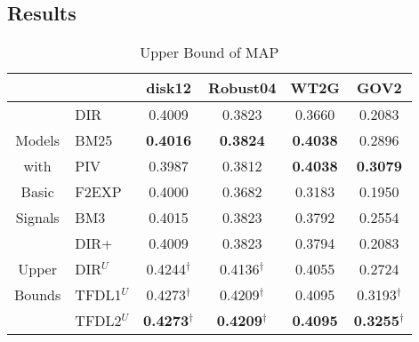 \subsection{Results}
\label{sec:res1}

\begin{table}[t]
\centering
\caption{Upper Bound of MAP}
\label{tab:results_optm}
\begin{tabular}{ clcccc } \hline
& & disk12 & Robust04 & WT2G & GOV2 \\ \hline \hline
& DIR & 0.4009 & 0.3823 & 0.3660 & 0.2083 \\ \cline{2-6}
Models & BM25 & \textbf{0.4016} & \textbf{0.3824} & \textbf{0.4038} & 0.2896 \\ \cline{2-6}
with & PIV & 0.3987 & 0.3812 & \textbf{0.4038} & \textbf{0.3079} \\ \cline{2-6}
Basic & F2EXP & 0.4000 & 0.3682 & 0.3183 & 0.1950 \\ \cline{2-6}
Signals & BM3 & 0.4015 & 0.3823 & 0.3792 & 0.2554 \\ \cline{2-6}
& DIR+ & 0.4009 & 0.3823 & 0.3794 & 0.2083 \\ \cline{2-6} \hline \hline 
Upper & DIR$^U$ & 0.4244$^\dagger$ & 0.4136$^\dagger$ & 0.4055 & 0.2724 \\ \cline{2-6}
Bounds & TFDL1$^U$ & 0.4273$^\dagger$ & 0.4209$^\dagger$ & 0.4095 & 0.3193$^\dagger$ \\ \cline{2-6}
& TFDL2$^U$ & \textbf{0.4273$^\dagger$} & \textbf{0.4209$^\dagger$} & \textbf{0.4095} & \textbf{0.3255$^\dagger$} \\ \cline{2-6}
\hline
\end{tabular}
\end{table}

